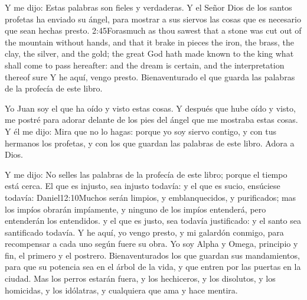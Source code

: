 Y me dijo: Estas palabras son fieles y verdaderas. Y el Señor Dios de los santos profetas ha enviado su ángel, para mostrar a sus siervos las cosas que es necesario que sean hechas presto.%
			{2:45}{Forasmuch as thou sawest that a stone was cut out of the mountain without hands, and that it brake in pieces the iron, the brass, the clay, the silver, and the gold; the great God hath made known to the king what shall come to pass hereafter: and the dream is certain, and the interpretation thereof sure}
Y he aquí, vengo presto.%
 Bienaventurado el que guarda las palabras de la profecía de este libro.

Yo Juan soy el que ha oído y visto estas cosas. Y después que hube oído y visto, me postré para adorar delante de los pies del ángel que me mostraba estas cosas. 
Y él me dijo: Mira que no lo hagas: porque yo soy siervo contigo, y con tus hermanos los profetas, y con los que guardan las palabras de este libro. Adora a Dios.

Y me dijo: No selles las palabras de la profecía de este libro; porque el tiempo está cerca. 
El que es injusto, sea injusto todavía: y el que es sucio, ensúciese todavía:%
					{Daniel}{12:10}{Muchos serán limpios, y emblanquecidos, y purificados; mas los impíos obrarán impíamente, y ninguno de los impíos entenderá, pero entenderán los entendidos.} %
 y el que es justo, sea todavía justificado: y el santo sea santificado todavía.%
Y he aquí, yo vengo presto, y mi galardón conmigo, para recompensar a cada uno según fuere su obra. 
Yo soy Alpha y Omega, principio y fin, el primero y el postrero. 
Bienaventurados los que guardan sus mandamientos, para que su potencia sea en el árbol de la vida, y que entren por las puertas en la ciudad.%
Mas los perros estarán fuera, y los hechiceros, y los disolutos, y los homicidas, y los idólatras, y cualquiera que ama y hace mentira.

